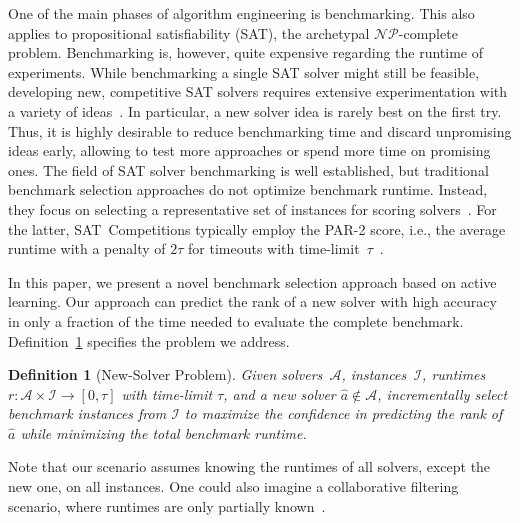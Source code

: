 \documentclass[sn-basic, Numbered]{sn-jnl} %
\newtheorem{definition}{Definition} %
\begin{document}
One of the main phases of algorithm engineering is benchmarking.
This also applies to propositional satisfiability (SAT), the archetypal $\mathcal{NP}$-complete problem.
Benchmarking is, however, quite expensive regarding the runtime of experiments.
While benchmarking a single SAT solver might still be feasible, developing new, competitive SAT solvers requires extensive experimentation with a variety of ideas~\cite{FroleyksHIJS21,sat2022}.
In particular, a new solver idea is rarely best on the first try.
Thus, it is highly desirable to reduce benchmarking time and discard unpromising ideas early, allowing to test more approaches or spend more time on promising ones.
The field of SAT solver benchmarking is well established, but traditional benchmark selection approaches do not optimize benchmark runtime.
Instead, they focus on selecting a representative set of instances for scoring solvers~\cite{Gelder11,HoosKSS13}.
For the latter, SAT~Competitions typically employ the \mbox{PAR-2} score, i.e., the average runtime with a penalty of $2 \tau$ for timeouts with time-limit~$\tau$~\cite{FroleyksHIJS21}.

In this paper, we present a novel benchmark selection approach based on active learning.
Our approach can predict the rank of a new solver with high accuracy in only a fraction of the time needed to evaluate the complete benchmark.
Definition~\ref{def:new-solver-problem} specifies the problem we address.

\begin{definition}[New-Solver Problem]
  Given solvers~$\mathcal{A}$, instances~$\mathcal{I}$, runtimes~$r\!: \mathcal{A} \times \mathcal{I} \rightarrow \left[0, \tau\right]$ with time-limit $\tau$, and a new solver $\hat{a} \notin \mathcal{A}$, incrementally select benchmark instances from $\mathcal{I}$ to maximize the confidence in predicting the rank of $\hat{a}$ while minimizing the total benchmark runtime.
  \label{def:new-solver-problem}
\end{definition}

Note that our scenario assumes knowing the runtimes of all solvers, except the new one, on all instances.
One could also imagine a collaborative filtering scenario, where runtimes are only partially known~\cite{misir2017data,misir2017alors}.
\end{document}
